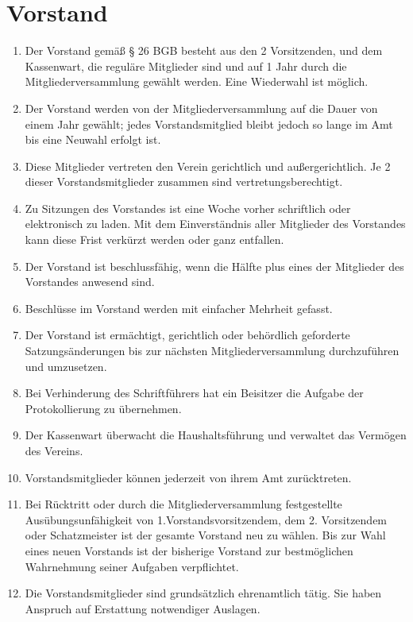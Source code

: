 \documentclass[ngerman]{article}
\begin{document}
\section{Vorstand}
\begin{enumerate}
  \item Der Vorstand gemäß § 26 BGB besteht aus den 2 Vorsitzenden, und dem Kassenwart, die reguläre Mitglieder sind und auf 1 Jahr durch die Mitgliederversammlung gewählt werden. Eine Wiederwahl ist möglich.
  \item Der Vorstand werden von der Mitgliederversammlung auf die Dauer von einem Jahr gewählt; jedes Vorstandsmitglied bleibt jedoch so lange im Amt bis eine Neuwahl erfolgt ist.
  \item Diese Mitglieder vertreten den Verein gerichtlich und außergerichtlich.
Je 2 dieser Vorstandsmitglieder zusammen sind vertretungsberechtigt.
  \item Zu Sitzungen des Vorstandes ist eine Woche vorher schriftlich oder elektronisch zu laden. 
Mit dem Einverständnis aller Mitglieder des Vorstandes kann diese Frist verkürzt werden oder ganz entfallen.
  \item Der Vorstand ist beschlussfähig, wenn die Hälfte plus eines der Mitglieder des Vorstandes anwesend sind.
  \item Beschlüsse im Vorstand werden mit einfacher Mehrheit gefasst.
  \item Der Vorstand ist ermächtigt, gerichtlich oder behördlich geforderte Satzungsänderungen bis zur nächsten Mitgliederversammlung durchzuführen und umzusetzen.
  \item Bei Verhinderung des Schriftführers hat ein Beisitzer die Aufgabe der Protokollierung zu übernehmen.
  \item Der Kassenwart überwacht die Haushaltsführung und verwaltet das Vermögen
des Vereins.
  \item Vorstandsmitglieder können jederzeit von ihrem Amt zurücktreten.
  \item Bei Rücktritt oder durch die Mitgliederversammlung festgestellte Ausübungsunfähigkeit von 1.Vorstandsvorsitzendem, dem 2. Vorsitzendem oder Schatzmeister ist der gesamte Vorstand neu zu wählen. Bis zur Wahl eines neuen Vorstands ist der bisherige Vorstand zur bestmöglichen Wahrnehmung seiner Aufgaben verpflichtet.
  \item Die Vorstandsmitglieder sind grundsätzlich ehrenamtlich tätig. Sie haben Anspruch auf Erstattung notwendiger Auslagen.
\end{enumerate}
\end{document}
